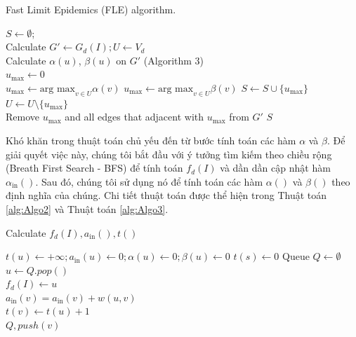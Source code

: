  	\begin{algorithm}[h]
 		\caption{Fast Limit Epidemics (FLE) algorithm.}
 		\label{alg:Algo1}
 		$S \gets \emptyset$; 
 		\\
 		Calculate $G' \gets G_{d}(I); U \gets V_{d}$
 		\\
 		{
 			Calculate $\alpha(u)$, $\beta(u)$ on $G'$ (Algorithm 3)
 			\\
 			$u_{\text{max}} \gets 0$
 			\\
 			{
 				$u_{\text{max}} \gets \text{arg max}_{v \in U}\alpha(v)$
 			}
 			{
 				$u_{\text{max}} \gets \text{arg max}_{v \in U}\beta(v)$
 			}
 			$S \gets S \cup \{u_{\text{max}}\}$
 			\\
 			$U \gets U \setminus \{u_{\text{max}}\}$
 			\\
 			Remove $u_{\text{max}}$ and all edges that adjacent with $u_{\text{max}}$ from $G'$
 		}
 		\Return $S$
 	\end{algorithm}
 	
 	Khó khăn trong thuật toán chủ yếu đến từ bước tính toán các hàm $\alpha$ và $\beta$. Để giải quyết việc này, chúng tôi bắt đầu với ý tưởng tìm kiếm theo chiều rộng (Breath First Search - BFS) để tính toán $f_{d}(I)$ và dần dần cập nhật hàm $\alpha_{\text{in}}()$. Sau đó, chúng tôi sử dụng nó để tính toán các hàm  $\alpha()$ và $\beta()$ theo định nghĩa của chúng. Chi tiết thuật toán được thể hiện trong Thuật toán \ref{alg:Algo2} và Thuật toán \ref{alg:Algo3}.
 	\begin{algorithm}[h]
 		\caption{Calculate $f_{d}(I), a_{\text{in}}(), t()$}
 		\label{alg:Algo2}
 		{
 			$t(u) \gets +\infty; a_{\text{in}}(u) \gets 0; \alpha(u) \gets 0; \beta(u) \gets 0$
 		}
 		{
 			$t(s) \gets 0$
 		} 
 		Queue $Q \gets \emptyset$
 		\\
 		{
 			$u \gets Q.pop()$
 			\\
 			$f_{d}(I) \gets u$
 			\\
 			{
 				{
 					{
 						$a_{\text{in}}(v)=a_{\text{in}}(v)+w(u,v)$
 						\\
 						{
 							$t(v) \gets t(u)+1$
 							\\
 							$Q,push(v)$
 						}
 					}
 				}
 			}	
 		}
 	\end{algorithm}
 	
